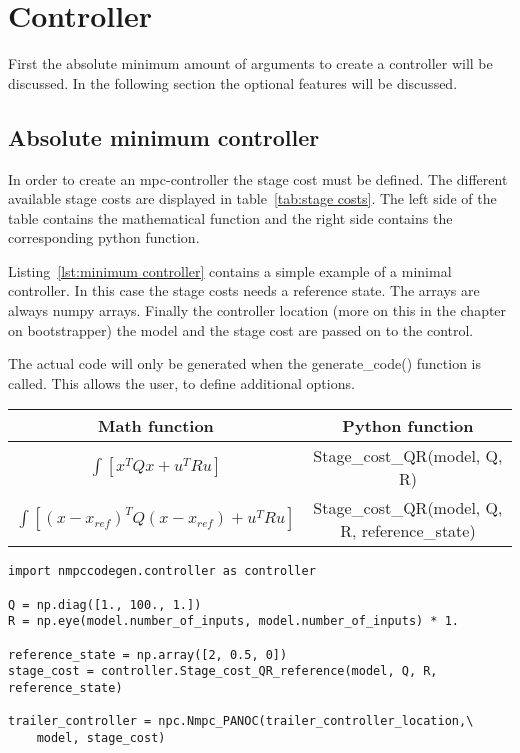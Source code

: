 \section{Controller}
First the absolute minimum amount of arguments to create a controller will be discussed. In the following section the optional features will be discussed.
\subsection{Absolute minimum controller}
In order to create an mpc-controller the stage cost must be defined. The different available stage costs are displayed in table~\ref{tab:stage costs}. The left side of the table contains the mathematical function and the right side contains the corresponding python function. 

Listing~\ref{lst:minimum controller} contains a simple example of a minimal controller. In this case the stage costs needs a reference state. The arrays are always numpy arrays. Finally the controller location (more on this in the chapter on bootstrapper) the model and the stage cost are passed on to the control.

The actual code will only be generated when the generate\_code() function is called. This allows the user, to define additional options.

\begin{center}
	\begin{tabular}{ |c|c| } 
		\hline
		Math function & Python function \\ 
		\hline
		$\int[x^TQx+u^TRu]$ & Stage\_cost\_QR(model, Q, R) \\ 
		\hline
		$\int[(x-x_{ref})^TQ(x-x_{ref})+u^TRu]$ & Stage\_cost\_QR(model, Q, R, reference\_state) \\ 
		\hline
	\end{tabular}
	\label{tab:stage costs}
\end{center}

\begin{lstlisting}[caption={simple controller},captionpos=b,label={lst:minimum controller}]
import nmpccodegen.controller as controller

Q = np.diag([1., 100., 1.])
R = np.eye(model.number_of_inputs, model.number_of_inputs) * 1.

reference_state = np.array([2, 0.5, 0])
stage_cost = controller.Stage_cost_QR_reference(model, Q, R, reference_state)

trailer_controller = npc.Nmpc_PANOC(trailer_controller_location,\
	model, stage_cost)
\end{lstlisting}

